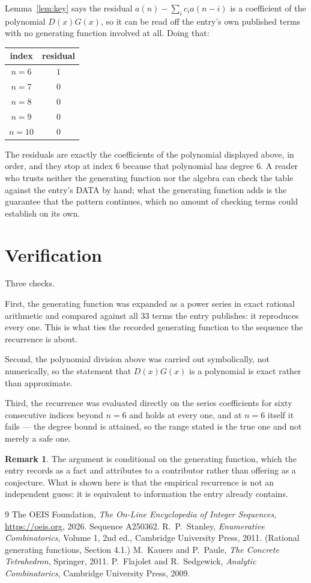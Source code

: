 \documentclass[11pt,a4paper]{article}
\theoremstyle{plain}
\theoremstyle{definition}
\newtheorem{remark}[theorem]{Remark}
\begin{document}
Lemma~\ref{lem:key} says the residual $a(n)-\sum_ic_ia(n-i)$ is a coefficient of the
polynomial $D(x)G(x)$, so it can be read off the entry's own published terms with no
generating function involved at all. Doing that:
\begin{center}
\begin{tabular}{cc}
index & residual \\ \hline
$n=6$ & $1$ \\
$n=7$ & $0$ \\
$n=8$ & $0$ \\
$n=9$ & $0$ \\
$n=10$ & $0$
\end{tabular}
\end{center}
The residuals are exactly the coefficients of the polynomial displayed above, in order, and
they stop at index $6$ because that polynomial has degree $6$. A reader who trusts
neither the generating function nor the algebra can check the table against the entry's DATA
by hand; what the generating function adds is the guarantee that the pattern continues, which
no amount of checking terms could establish on its own.

\section{Verification}

Three checks.

First, the generating function was expanded as a power series in exact rational arithmetic and
compared against all $33$ terms the entry publishes: it reproduces every one. This is
what ties the recorded generating function to the sequence the recurrence is about.

Second, the polynomial division above was carried out symbolically, not numerically, so the
statement that $D(x)G(x)$ is a polynomial is exact rather than approximate.

Third, the recurrence was evaluated directly on the series coefficients for sixty consecutive
indices beyond $n=6$ and holds at every one, and at $n=6$ itself it fails --- the
degree bound is attained, so the range stated is the true one and not merely a safe one.

\begin{remark}
The argument is conditional on the generating function, which the entry records as a fact and
attributes to a contributor rather than offering as a conjecture. What is shown here is that
the empirical recurrence is not an independent guess: it is equivalent to information the
entry already contains.
\end{remark}

\begin{thebibliography}{9}
 The OEIS Foundation, \emph{The On-Line Encyclopedia of Integer
Sequences}, \url{https://oeis.org}, 2026. Sequence A250362.
 R.~P.~Stanley, \emph{Enumerative Combinatorics}, Volume 1, 2nd ed.,
Cambridge University Press, 2011. (Rational generating functions, Section 4.1.)
 M.~Kauers and P.~Paule, \emph{The Concrete Tetrahedron}, Springer, 2011.
 P.~Flajolet and R.~Sedgewick, \emph{Analytic Combinatorics}, Cambridge
University Press, 2009.
\end{thebibliography}
\end{document}
